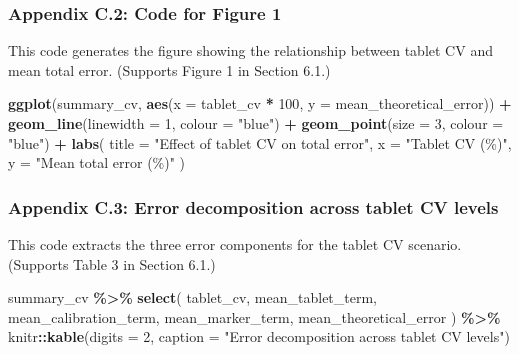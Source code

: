\documentclass[
  12pt,
]{article}
\newenvironment{Shaded}{\begin{snugshade}}{\end{snugshade}}
\newcommand{\AttributeTok}[1]{\textcolor[rgb]{0.13,0.29,0.53}{#1}}
\newcommand{\DecValTok}[1]{\textcolor[rgb]{0.00,0.00,0.81}{#1}}
\newcommand{\FunctionTok}[1]{\textcolor[rgb]{0.13,0.29,0.53}{\textbf{#1}}}
\newcommand{\NormalTok}[1]{#1}
\newcommand{\SpecialCharTok}[1]{\textcolor[rgb]{0.81,0.36,0.00}{\textbf{#1}}}
\newcommand{\StringTok}[1]{\textcolor[rgb]{0.31,0.60,0.02}{#1}}
\begin{document}
\subsubsection{Appendix C.2: Code for Figure
1}\label{appendix-c.2-code-for-figure-1}

This code generates the figure showing the relationship between tablet
CV and mean total error. (Supports Figure 1 in Section 6.1.)

\begin{Shaded}
\begin{Highlighting}[]
\FunctionTok{ggplot}\NormalTok{(summary\_cv, }\FunctionTok{aes}\NormalTok{(}\AttributeTok{x =}\NormalTok{ tablet\_cv }\SpecialCharTok{*} \DecValTok{100}\NormalTok{, }\AttributeTok{y =}\NormalTok{ mean\_theoretical\_error)) }\SpecialCharTok{+}
  \FunctionTok{geom\_line}\NormalTok{(}\AttributeTok{linewidth =} \DecValTok{1}\NormalTok{, }\AttributeTok{colour =} \StringTok{"blue"}\NormalTok{) }\SpecialCharTok{+}
  \FunctionTok{geom\_point}\NormalTok{(}\AttributeTok{size =} \DecValTok{3}\NormalTok{, }\AttributeTok{colour =} \StringTok{"blue"}\NormalTok{) }\SpecialCharTok{+}
  \FunctionTok{labs}\NormalTok{(}
    \AttributeTok{title =} \StringTok{"Effect of tablet CV on total error"}\NormalTok{,}
    \AttributeTok{x =} \StringTok{"Tablet CV (\%)"}\NormalTok{,}
    \AttributeTok{y =} \StringTok{"Mean total error (\%)"}
\NormalTok{  )}
\end{Highlighting}
\end{Shaded}

\subsubsection{Appendix C.3: Error decomposition across tablet CV
levels}\label{appendix-c.3-error-decomposition-across-tablet-cv-levels}

This code extracts the three error components for the tablet CV
scenario. (Supports Table 3 in Section 6.1.)

\begin{Shaded}
\begin{Highlighting}[]
\NormalTok{summary\_cv }\SpecialCharTok{\%\textgreater{}\%}
  \FunctionTok{select}\NormalTok{(}
\NormalTok{    tablet\_cv,}
\NormalTok{    mean\_tablet\_term,}
\NormalTok{    mean\_calibration\_term,}
\NormalTok{    mean\_marker\_term,}
\NormalTok{    mean\_theoretical\_error}
\NormalTok{  ) }\SpecialCharTok{\%\textgreater{}\%}
\NormalTok{  knitr}\SpecialCharTok{::}\FunctionTok{kable}\NormalTok{(}\AttributeTok{digits =} \DecValTok{2}\NormalTok{, }\AttributeTok{caption =} \StringTok{"Error decomposition across tablet CV levels"}\NormalTok{)}
\end{Highlighting}
\end{Shaded}
\end{document}
